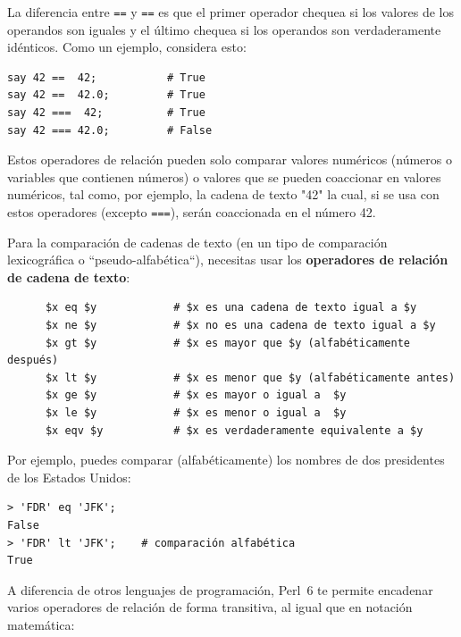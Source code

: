 La diferencia entre {\tt ==} y {\tt ==} es que el primer
operador chequea si los valores de los operandos son iguales
y el último chequea si los  operandos son verdaderamente
idénticos. Como un ejemplo, considera esto:

\begin{lstlisting}
say 42 ==  42;           # True
say 42 ==  42.0;         # True
say 42 ===  42;          # True
say 42 === 42.0;         # False
\end{lstlisting}
%

Estos operadores de relación pueden solo comparar 
valores numéricos (números o variables que contienen
números) o valores que se pueden coaccionar en 
valores numéricos, tal como, por ejemplo,
la cadena de texto "42" la cual, si se usa con estos
operadores (excepto {\tt ===}), serán coaccionada 
en el número 42.

Para la comparación de cadenas de texto (en un tipo de 
comparación lexicográfica o ``pseudo-alfabética``),
necesitas usar los {\bf operadores de relación de cadena
de texto}:

\begin{lstlisting}
      $x eq $y            # $x es una cadena de texto igual a $y
      $x ne $y            # $x no es una cadena de texto igual a $y
      $x gt $y            # $x es mayor que $y (alfabéticamente después)
      $x lt $y            # $x es menor que $y (alfabéticamente antes)
      $x ge $y            # $x es mayor o igual a  $y
      $x le $y            # $x es menor o igual a  $y
      $x eqv $y           # $x es verdaderamente equivalente a $y
\end{lstlisting}
%  



Por ejemplo, puedes comparar (alfabéticamente) los nombres
de dos presidentes de los Estados Unidos:
\begin{lstlisting}
> 'FDR' eq 'JFK';
False
> 'FDR' lt 'JFK';    # comparación alfabética
True
\end{lstlisting}
%  

A diferencia de otros lenguajes de programación, Perl~6 te permite 
encadenar varios operadores de relación de forma transitiva,
al igual que en notación matemática:

